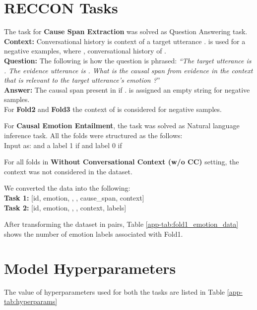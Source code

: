 \documentclass{article}
\begin{document}
\section{RECCON Tasks}
\label{app:reccon_tasks}
The task for \textbf{Cause Span Extraction} was solved as Question Answering task.
\textbf{Context:} Conversational history is context of a target utterance .  is used for a negative examples, where , conversational history of . \\
\textbf{Question:} The following is how the question is phrased: \textit{“The target utterance is . The evidence utterance is . What is the causal span from evidence in the context that is relevant to the target utterance’s emotion ?}”\\
\textbf{Answer:} The causal span present in  if .  is assigned an empty string for negative samples.\\
For \textbf{Fold2} and \textbf{Fold3} the context of  is considered for negative samples.

For \textbf{Causal Emotion Entailment}, the task was solved as Natural language inference task. All the folds were structured as the 
follows:\\
Input as: \textit{}
and a label 1 if  and label 0 if 

For all folds in \textbf{Without Conversational Context (w/o CC)} setting, the context was not considered in the dataset.

\noindent We converted the data into the following:\\
\textbf{Task 1:} [id, emotion, , , cause\_span, context]\\
\textbf{Task 2:} [id, emotion, , , context, labels]

After transforming the dataset in  pairs, Table \ref{app-tab:fold1_emotion_data} shows the number of emotion labels associated with Fold1.


\section{Model Hyperparameters} \label{app:hyperparams}

The value of hyperparameters used for both the tasks are listed in Table \ref{app-tab:hyperparams}
\end{document}
